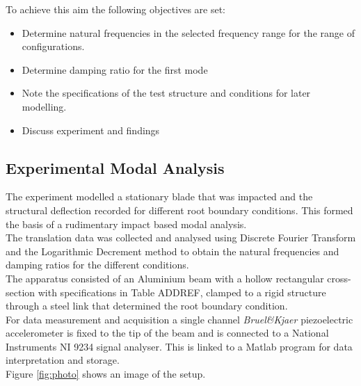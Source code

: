 \documentclass[11pt]{article}
\begin{document}
To achieve this aim the following objectives are set:
\begin{itemize}
    \item Determine natural frequencies in the selected frequency range for the range of configurations.
    \item Determine damping ratio for the first mode 
    \item Note the specifications of the test structure and conditions for later modelling.
    \item Discuss experiment and findings
\end{itemize}{}




\subsection{Experimental Modal Analysis}
The experiment modelled a stationary blade that was impacted and the structural deflection recorded for different root boundary conditions. This formed the basis of a rudimentary impact based modal analysis. \\
The translation data was collected and analysed using Discrete Fourier Transform and the Logarithmic Decrement method to obtain the natural frequencies and damping ratios for the different conditions.\\
The apparatus consisted of an Aluminium beam with a hollow rectangular cross-section with specifications in Table ADDREF, clamped to a rigid structure through a steel link that determined the root boundary condition.\\
For data measurement and acquisition a single channel \textit{Bruel\&Kjaer} piezoelectric accelerometer is fixed to the tip of the beam and is connected to a National Instruments NI 9234 signal analyser. This is linked to a Matlab program for data interpretation and storage. \\
Figure \ref{fig:photo} shows an image of the setup.
\end{document}
